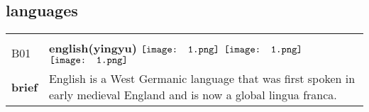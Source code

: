 \documentclass[UTF8]{article}
\begin{document}
        \subsection{\Large languages}
    \vspace{-10pt}
            \begin{tabularx}{\textwidth}{p{1.5cm}X}
            \arrayrulecolor{myBlue}
        	\hline\\
            \small{B01}&
            \large{\bfseries{english(yingyu)}}\hfill
                                                            \phantom{$\vcenter{\hbox{\texttt{[image: 1.png]}}}$}
                                                                $\vcenter{\hbox{\texttt{[image: 1.png]}}}$
                                                                $\vcenter{\hbox{\texttt{[image: 1.png]}}}$
                                                                \phantom{$\vcenter{\hbox{\texttt{[image: 1.png]}}}$}
                                                                \phantom{$\vcenter{\hbox{\texttt{[image: 1.png]}}}$}
                                                                $\vcenter{\hbox{\texttt{[image: 1.png]}}}$
                                                                \phantom{$\vcenter{\hbox{\texttt{[image: 1.png]}}}$}
                                        \\[10pt]
            \large{\bfseries{brief}}&\noindent\parbox[c]{\hsize}{English is a West Germanic language that was first spoken in early medieval England and is now a global lingua franca.} \\[5pt]
            \hline\\[-10pt]
        \end{tabularx}
\end{document}
